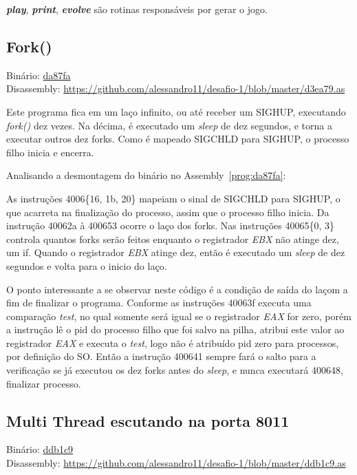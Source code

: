 \par\textbf{\emph{play}}, \textbf{\emph{print}},
\textbf{\emph{evolve}} são rotinas responsáveis por gerar o jogo.


\subsection{Fork()}
\noindent Binário: \href{https://s3.amazonaws.com/chaordic-desafio-cloud/da87fa}{da87fa}\\
Disassembly:
\href{https://github.com/alessandro11/desafio-1/blob/master/d3ea79.as}{https://github.com/alessandro11/desafio-1/blob/master/d3ea79.as}\\
\par
Este programa fica em um laço infinito, ou até receber um SIGHUP,
executando \emph{fork()} dez vezes. Na décima, é executado um
\emph{sleep} de dez segundos, e torna a executar outros dez
forks. Como é mapeado SIGCHLD para SIGHUP, o processo filho inicia e
encerra.\\
\par
Analisando a desmontagem do binário no Assembly~\ref{prog:da87fa}:



As instruções 4006\{16, 1b, 20\} mapeiam o sinal de SIGCHLD para
SIGHUP, o que acarreta na finalização do processo, assim que o processo
filho inicia. Da instrução 40062a à 400653 ocorre o laço dos
forks. Nas instruções 40065\{0, 3\} controla quantos forks serão
feitos enquanto o registrador \emph{EBX} não atinge dez, um if. Quando o
registrador \emph{EBX} atinge dez, então é executado um \emph{sleep} de dez
segundos e volta para o inicio do laço.

O ponto interessante a se observar neste código é a condição de saída do
laçom a fim de finalizar o programa. Conforme as instruções 40063f executa uma comparação
\emph{test}, no qual somente será igual se o registrador \emph{EAX} for zero,
porém a instrução lê o pid do processo filho que foi salvo na pilha,
atribui este valor ao registrador \emph{EAX} e executa o \emph{test}, logo
não é atribuído pid zero para processos, por definição do SO. Então a
instrução 400641 sempre fará o salto para a verificação se já executou
os dez forks antes do \emph{sleep}, e nunca executará 400648,
finalizar processo.


\subsection{Multi Thread escutando na porta 8011}
\noindent Binário: \href{https://s3.amazonaws.com/chaordic-desafio-cloud/ddb1c9}{ddb1c9}\\
Disassembly:
\href{https://github.com/alessandro11/desafio-1/blob/master/ddb1c9.as}{https://github.com/alessandro11/desafio-1/blob/master/ddb1c9.as}\\

